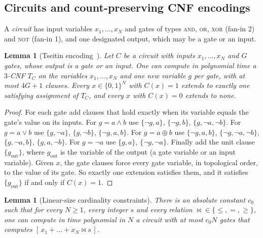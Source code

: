 \documentclass[11pt]{amsart}
\newtheorem{lemma}[theorem]{Lemma}
\theoremstyle{definition}
\theoremstyle{remark}
\begin{document}
\subsection{Circuits and count-preserving CNF encodings}

A \emph{circuit} has input variables $x_1,\dots,x_N$ and gates of types \textsc{and}, \textsc{or}, \textsc{xor} (fan-in 2) and \textsc{not} (fan-in 1), and one designated output, which may be a gate or an input.

\begin{lemma}[Tseitin encoding~\cite{Tse68}]\label{lem:tseitin}
Let $C$ be a circuit with inputs $x_1,\dots,x_N$ and $G$ gates, whose output is a gate or an input. One can compute in polynomial time a $3$-CNF $T_C$ on the variables $x_1,\dots,x_N$ and one new variable $g$ per gate, with at most $4G+1$ clauses. Every $x\in\{0,1\}^N$ with $C(x)=1$ extends to exactly one satisfying assignment of $T_C$, and every $x$ with $C(x)=0$ extends to none.
\end{lemma}

\begin{proof}
For each gate add clauses that hold exactly when its variable equals the gate's value on its inputs. For $g=a\wedge b$ use $\{\neg g,a\}$, $\{\neg g,b\}$, $\{g,\neg a,\neg b\}$. For $g=a\vee b$ use $\{g,\neg a\}$, $\{g,\neg b\}$, $\{\neg g,a,b\}$. For $g=a\oplus b$ use $\{\neg g,a,b\}$, $\{\neg g,\neg a,\neg b\}$, $\{g,\neg a,b\}$, $\{g,a,\neg b\}$. For $g=\neg a$ use $\{g,a\}$, $\{\neg g,\neg a\}$. Finally add the unit clause $\{g_{\mathrm{out}}\}$, where $g_{\mathrm{out}}$ is the variable of the output (a gate variable or an input variable). Given $x$, the gate clauses force every gate variable, in topological order, to the value of its gate. So exactly one extension satisfies them, and it satisfies $\{g_{\mathrm{out}}\}$ if and only if $C(x)=1$.
\end{proof}

\begin{lemma}[Linear-size cardinality constraints]\label{lem:card}
There is an absolute constant $c_0$ such that for every $N\ge 1$, every integer $s$ and every relation ${\bowtie}\in\{\le,=,\ge\}$, one can compute in time polynomial in $N$ a circuit with at most $c_0N$ gates that computes $[\,x_1+\dots+x_N\bowtie s\,]$.
\end{lemma}
\end{document}

